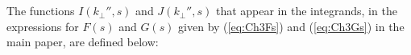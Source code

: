 \documentclass{jfm}
\begin{document}
\section{} \label{App:B}
The functions $I(k_\perp'',s)$ and $J(k_\perp'',s)$ that appear in the integrands, in the expressions for $F(s)$ and $G(s)$ given by (\ref{eq:Ch3Fs}) and (\ref{eq:Ch3Gs}) in the main paper, are defined below:
\end{document}
